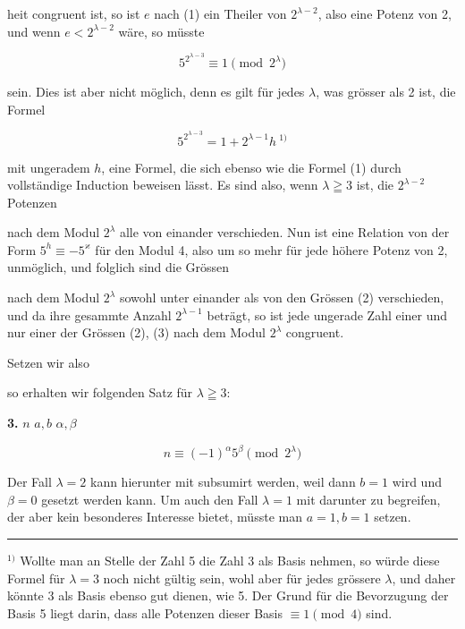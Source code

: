 
heit congruent ist, so ist $e$ nach (1) ein Theiler von $2^{\lambda-2}$, also eine Potenz von 2, und wenn $e < 2^{\lambda-2}$ wäre, so müsste

\[
5^{2^{\lambda-3}} \equiv 1 \pmod{2^\lambda}
\]

sein. Dies ist aber nicht möglich, denn es gilt für jedes $\lambda$, was grösser als 2 ist, die Formel

\[
5^{2^{\lambda-3}} = 1 + 2^{\lambda-1} h\ ^{1)}
\]

mit ungeradem $h$, eine Formel, die sich ebenso wie die Formel (1) durch vollständige Induction beweisen lässt. Es sind also, wenn $\lambda \geqq 3$ ist,
die $2^{\lambda-2}$ Potenzen


nach dem Modul $2^\lambda$ alle von einander verschieden. Nun ist eine Relation von der Form $5^h \equiv -5^\varkappa$ für den Modul 4, also um so mehr für jede höhere Potenz von 2, unmöglich, und folglich sind die Grössen


nach dem Modul $2^\lambda$ sowohl unter einander als von den Grössen (2) verschieden, und da ihre gesammte Anzahl $2^{\lambda-1}$ beträgt, so ist jede ungerade Zahl einer und nur einer der Grössen (2), (3) nach dem Modul $2^\lambda$ congruent.

Setzen wir also


so erhalten wir folgenden Satz für $\lambda \geqq 3$:

\noindent\textbf{3.}  $n$  $a, b$  $\alpha, \beta$ 

\[
n \equiv (-1)^\alpha 5^\beta \pmod{2^\lambda}
\]


Der Fall $\lambda = 2$ kann hierunter mit subsumirt werden, weil dann $b = 1$ wird und $\beta = 0$ gesetzt werden kann. Um auch den Fall $\lambda = 1$ mit darunter zu begreifen, der aber kein besonderes Interesse bietet, müsste man $a = 1, b = 1$ setzen.

\noindent\rule{4cm}{0.4pt}

\noindent $^{1)}$ Wollte man an Stelle der Zahl 5 die Zahl 3 als Basis nehmen, so würde diese Formel für $\lambda = 3$ noch nicht gültig sein, wohl aber für jedes grössere $\lambda$, und daher könnte 3 als Basis ebenso gut dienen, wie 5. Der Grund für die Bevorzugung der Basis 5 liegt darin, dass alle Potenzen dieser Basis $\equiv 1 \pmod{4}$ sind.
